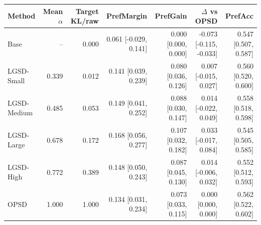 \begin{tabular}{lrrrrrr}
\toprule
Method & Mean $\alpha$ & Target KL/raw & PrefMargin & PrefGain & $\Delta$ vs OPSD & PrefAcc \\
\midrule
Base & -- & 0.000 & 0.061 [-0.029, 0.141] & 0.000 [0.000, 0.000] & -0.073 [-0.115, -0.033] & 0.547 [0.507, 0.587] \\
LGSD-Small & 0.339 & 0.012 & 0.141 [0.039, 0.239] & 0.080 [0.036, 0.126] & 0.007 [-0.015, 0.027] & 0.560 [0.520, 0.600] \\
LGSD-Medium & 0.485 & 0.053 & 0.149 [0.041, 0.252] & 0.088 [0.030, 0.147] & 0.014 [-0.022, 0.049] & 0.558 [0.518, 0.598] \\
LGSD-Large & 0.678 & 0.172 & 0.168 [0.056, 0.277] & 0.107 [0.032, 0.182] & 0.033 [-0.017, 0.084] & 0.545 [0.505, 0.585] \\
LGSD-High & 0.772 & 0.389 & 0.148 [0.050, 0.243] & 0.087 [0.045, 0.130] & 0.014 [-0.006, 0.032] & 0.552 [0.512, 0.593] \\
OPSD & 1.000 & 1.000 & 0.134 [0.031, 0.234] & 0.073 [0.033, 0.115] & 0.000 [0.000, 0.000] & 0.562 [0.522, 0.602] \\
\bottomrule
\end{tabular}
